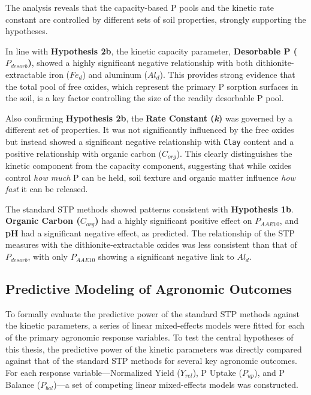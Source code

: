 \documentclass[
  a4paper,
]{article}
\begin{document}
The analysis reveals that the capacity-based P pools and the kinetic
rate constant are controlled by different sets of soil properties,
strongly supporting the hypotheses.

In line with \textbf{Hypothesis 2b}, the kinetic capacity parameter,
\textbf{Desorbable P (\(P_{desorb}\))}, showed a highly significant
negative relationship with both dithionite-extractable iron (\(Fe_d\))
and aluminum (\(Al_d\)). This provides strong evidence that the total
pool of free oxides, which represent the primary P sorption surfaces in
the soil, is a key factor controlling the size of the readily desorbable
P pool.

Also confirming \textbf{Hypothesis 2b}, the \textbf{Rate Constant
(\emph{k})} was governed by a different set of properties. It was not
significantly influenced by the free oxides but instead showed a
significant negative relationship with \texttt{Clay} content and a
positive relationship with organic carbon (\(C_{org}\)). This clearly
distinguishes the kinetic component from the capacity component,
suggesting that while oxides control \emph{how much} P can be held, soil
texture and organic matter influence \emph{how fast} it can be released.

The standard STP methods showed patterns consistent with
\textbf{Hypothesis 1b}. \textbf{Organic Carbon (\(C_{org}\))} had a
highly significant positive effect on \(P_{AAE10}\), and \textbf{pH} had
a significant negative effect, as predicted. The relationship of the STP
measures with the dithionite-extractable oxides was less consistent than
that of \(P_{desorb}\), with only \(P_{AAE10}\) showing a significant
negative link to \(Al_d\).

\subsection{Predictive Modeling of Agronomic
Outcomes}\label{sec-agronomic-modeling}

To formally evaluate the predictive power of the standard STP methods
against the kinetic parameters, a series of linear mixed-effects models
were fitted for each of the primary agronomic response variables. To
test the central hypotheses of this thesis, the predictive power of the
kinetic parameters was directly compared against that of the standard
STP methods for several key agronomic outcomes. For each response
variable---Normalized Yield (\(Y_{rel}\)), P Uptake (\(P_{up}\)), and P
Balance (\(P_{bal}\))---a set of competing linear mixed-effects models
was constructed.
\end{document}
